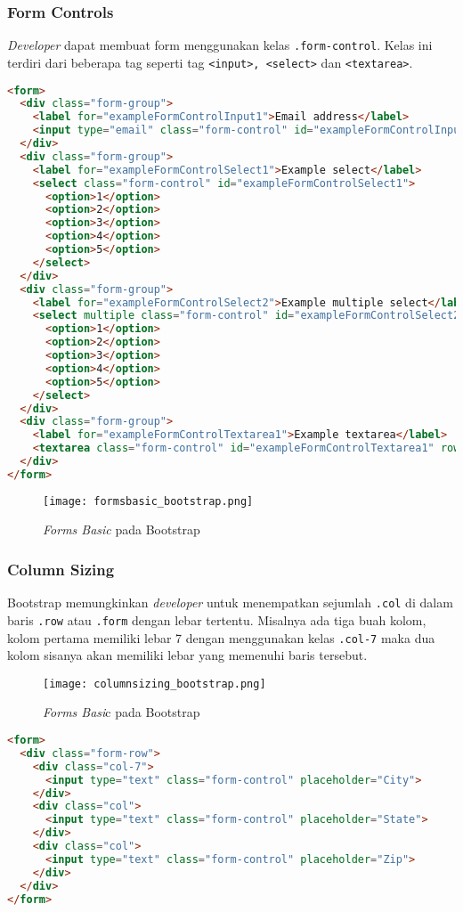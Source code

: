 \begin{itemize}
\subsubsection{Form Controls}
\textit{Developer} dapat membuat form menggunakan kelas \texttt{.form-control}. Kelas ini terdiri dari beberapa tag seperti tag \texttt{<input>, <select>} dan \texttt{<textarea>}.
\begin{lstlisting}[language=HTML, frame=single, basicstyle=\small]  
<form>
  <div class="form-group">
    <label for="exampleFormControlInput1">Email address</label>
    <input type="email" class="form-control" id="exampleFormControlInput1" placeholder="name@example.com">
  </div>
  <div class="form-group">
    <label for="exampleFormControlSelect1">Example select</label>
    <select class="form-control" id="exampleFormControlSelect1">
      <option>1</option>
      <option>2</option>
      <option>3</option>
      <option>4</option>
      <option>5</option>
    </select>
  </div>
  <div class="form-group">
    <label for="exampleFormControlSelect2">Example multiple select</label>
    <select multiple class="form-control" id="exampleFormControlSelect2">
      <option>1</option>
      <option>2</option>
      <option>3</option>
      <option>4</option>
      <option>5</option>
    </select>
  </div>
  <div class="form-group">
    <label for="exampleFormControlTextarea1">Example textarea</label>
    <textarea class="form-control" id="exampleFormControlTextarea1" rows="3"></textarea>
  </div>
</form>
\end{lstlisting}

\begin{figure} [H]
	\centering  
	\texttt{[image: formsbasic\_bootstrap.png]}  
	\caption{\textit{Forms Basic} pada Bootstrap} 
\end{figure} 
\subsubsection{Column Sizing}
Bootstrap memungkinkan \textit{developer} untuk menempatkan sejumlah \texttt{.col} di dalam baris \texttt{.row} atau \texttt{.form} dengan lebar tertentu. Misalnya ada tiga buah kolom, kolom pertama memiliki lebar 7 dengan menggunakan kelas \texttt{.col-7} maka dua kolom sisanya akan memiliki lebar yang  memenuhi baris tersebut.
\begin{figure} [H]
	\centering  
	\texttt{[image: columnsizing\_bootstrap.png]}  
	\caption{\textit{Forms Basi}c pada Bootstrap} 
\end{figure} 
\begin{lstlisting}[language=HTML, frame=single, basicstyle=\small] 
<form>
  <div class="form-row">
    <div class="col-7">
      <input type="text" class="form-control" placeholder="City">
    </div>
    <div class="col">
      <input type="text" class="form-control" placeholder="State">
    </div>
    <div class="col">
      <input type="text" class="form-control" placeholder="Zip">
    </div>
  </div>
</form>
\end{lstlisting}

\end{itemize}
